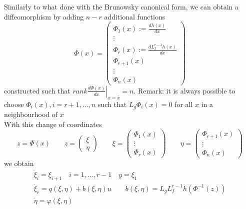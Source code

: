 \documentclass{book}
\newcommand\eval[2]{\left.#1\right|_{#2}}
\theoremstyle{definition}
\theoremstyle{remark}
\theoremstyle{remark}
\begin{document}
Similarly to what done with the Brunowsky canonical form, we can obtain a diffeomorphism by adding $n-r$ additional functions
\[
    \Phi(x)=\begin{pmatrix}
        \Phi_1(x):=\frac{dh(x)}{dx}\\\vdots\\\Phi_r(x):=\frac{dL_f^{r-1}h(x)}{dx}\\ \Phi_{r+1}(x)\\\vdots\\\Phi_n(x)
    \end{pmatrix}
\]
constructed such that $rank\eval{\frac{d\Phi(x)}{dx}}{x=\bar{x}}=n.$
Remark: it is always possible to choose $\Phi_i(x),i=r+1,\dots,n$ such that $L_g\Phi_i(x)=0$ for all $x$ in a neighbourhood of $x$\\
With this change of coordinates
\[
    z=\Phi(x)\qquad z=\begin{pmatrix}
        \xi\\\eta
    \end{pmatrix} \qquad \xi=\begin{pmatrix}
        \Phi_1(x) \\ \vdots \\ \Phi_r(x)
    \end{pmatrix} \qquad \eta=\begin{pmatrix}
        \Phi_{r+1}(x) \\ \vdots \\ \Phi_n(x)
    \end{pmatrix}
\]
we obtain
\begin{gather*}
    \dot{\xi}_i=\xi_{i+1} \quad i=1,\dots,r-1 \quad y=\xi_1\\
    \dot{\xi}_r=q(\xi,\eta)+b(\xi,\eta)u \qquad b(\xi,\eta)=L_gL_f^{r-1}h(\Phi^{-1}(z))\\
    \dot{\eta}=\varphi(\xi,\eta)
\end{gather*}
\end{document}
